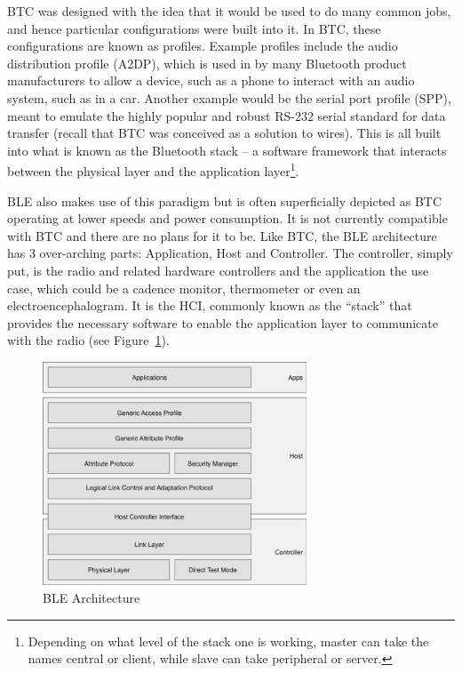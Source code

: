 \documentclass[]{article}
\begin{document}
\ac{BTC} was designed with the idea that it would be used to do many common jobs, and hence particular configurations were built into it. In \ac{BTC}, these configurations are known as profiles. Example profiles include the audio distribution profile (A2DP), which is used in by many Bluetooth product manufacturers to allow a device, such as a phone to interact with an audio system, such as in a car. Another example would be the serial port profile (SPP), meant to emulate the highly popular and robust RS-232 serial standard for data transfer (recall that \ac{BTC} was conceived as a solution to wires). This is all built into what is known as the Bluetooth stack – a software framework that interacts between the physical layer and the application layer\footnote{Depending on what level of the stack one is working, master can take the names central or client, while slave can take peripheral or server.}.  

\ac{BLE} also makes use of this paradigm but is often superficially depicted as \ac{BTC} operating at lower speeds and power consumption. It is not currently compatible with \ac{BTC} and there are no plans for it to be. Like \ac{BTC}, the \ac{BLE} architecture has 3 over-arching parts: Application, Host and Controller. The controller, simply put, is the radio and related hardware controllers and the application the use case, which could be a cadence monitor, thermometer or even an electroencephalogram. It is the \ac{HCI}, commonly known as the “stack” that provides the necessary software to enable the application layer to communicate with the radio (see Figure~\ref{fig:ble_arch}).

\begin{figure}[htb]
	\begin{center}
		\includegraphics[width = 0.7\textwidth]{ble_arch}
	\end{center}
	\caption{\ac{BLE} Architecture}
	\label{fig:ble_arch}
\end{figure}
\end{document}
